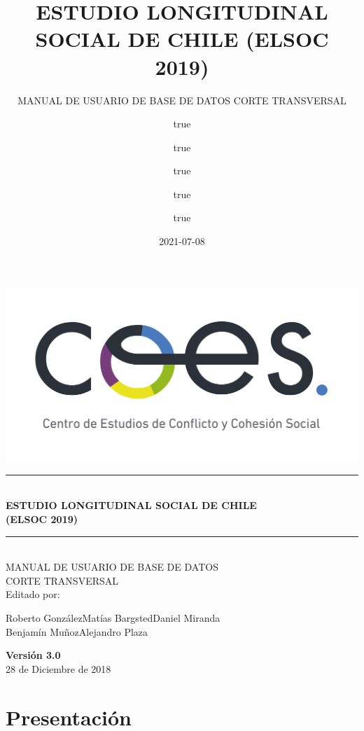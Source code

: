 \documentclass[
]{book}
\title{ESTUDIO LONGITUDINAL SOCIAL DE CHILE (ELSOC 2019)}
\subtitle{MANUAL DE USUARIO DE BASE DE DATOS CORTE TRANSVERSAL}
\author{true \and true \and true \and true \and true}
\date{2021-07-08}
\newcommand{\HRule}[1]{\rule{\linewidth}{#1}}
\begin{document}
\maketitle


\begin{titlepage}
	\centering
	\includegraphics[width=16cm]{coes_blanco_esp.jpg}

\HRule{1.4pt} \\
\LARGE \textbf{\uppercase{Estudio Longitudinal Social de Chile}}\\
\LARGE \textbf{\uppercase{(ELSOC 2019)}}\\

\HRule{1.4pt} \\ [0.2cm]

\normalsize  \vspace*{0.2\baselineskip}
 \large \textsc{MANUAL DE USUARIO DE BASE DE DATOS\\ 	CORTE TRANSVERSAL}
\\ [0.2cm]
\vspace*{0.9cm}
Editado por:\\
\begin{center}
Roberto González\hspace*{1.25cm}Matías Bargsted\hspace*{1.25cm}Daniel Miranda\\
Benjamín Muñoz\hspace*{1.5cm}Alejandro Plaza\\
\end{center}
\vspace*{1.3cm}
\textbf{Versión 3.0}\\
28 de Diciembre de 2018\\
\end{titlepage}

{
\setcounter{tocdepth}{1}
\tableofcontents
}
\hypertarget{present}{%
\chapter{Presentación}\label{present}}
\end{document}
